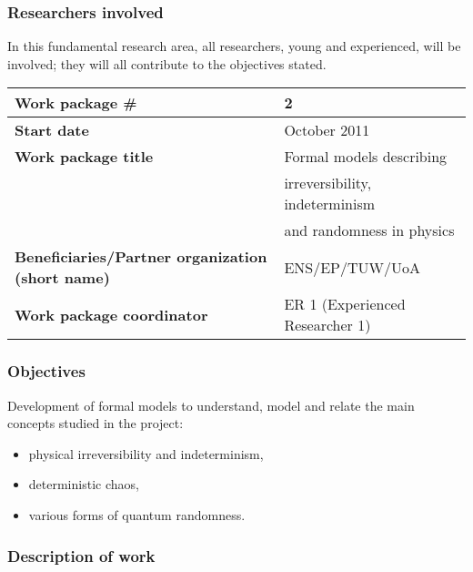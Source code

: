 \documentclass[12pt]{article}
\let\oldmarginpar\marginpar
\renewcommand\marginpar[1]{\-\oldmarginpar[\raggedleft\footnotesize #1]%
{\raggedright\footnotesize #1}}
\begin{document}

\subsubsection*{Researchers involved}

In this fundamental research area,
all researchers, young and experienced, will be involved; they will all contribute to the objectives stated.




\begin{center}
{
\begin{tabular}{|l|l|}
\hline
{\bf Work  package \#}&2\\
\hline
{\bf Start date}&October 2011\\
\hline
{\bf Work  package title}&Formal models describing  \\&   irreversibility, indeterminism \\&  and randomness in physics\\
\hline
{\bf Beneficiaries/Partner organization (short name)}&ENS/EP/TUW/UoA\\
\hline
{\bf Work  package coordinator}&ER 1 (Experienced Researcher 1) \\
\hline
\end{tabular}
}
\end{center}

\subsubsection*{Objectives}



Development of formal models to understand, model and relate the main concepts studied in the project:
\begin{itemize}
\item physical  irreversibility and indeterminism,
\item deterministic chaos,
\item various forms of quantum randomness.
\end{itemize}


\subsubsection*{Description of work}
\end{document}
